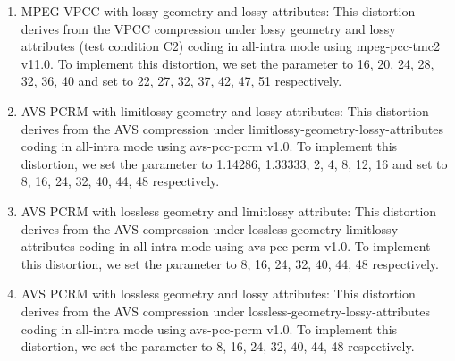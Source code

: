 \documentclass[acmsmall]{acmart}
\begin{document}
\begin{enumerate}
  \item {\sf MPEG VPCC with lossy geometry and lossy attributes}:  This distortion derives from the VPCC compression under lossy geometry and lossy attributes (test condition C2) coding in all-intra mode using mpeg-pcc-tmc2 v11.0. To implement this distortion, we set the parameter  to 16, 20, 24, 28, 32, 36, 40 and set  to 22, 27, 32, 37, 42, 47, 51 respectively.
  \item {\sf AVS PCRM with limitlossy geometry and lossy attributes}: This distortion derives from the AVS compression under limitlossy-geometry-lossy-attributes coding in all-intra mode using avs-pcc-pcrm v1.0. To implement this distortion, we set the parameter  to 1.14286, 1.33333, 2, 4, 8, 12, 16 and set  to 8, 16, 24, 32, 40, 44, 48 respectively.
  \item {\sf AVS PCRM with lossless geometry and limitlossy attribute}: This distortion derives from the AVS compression under lossless-geometry-limitlossy-attributes coding in all-intra mode using avs-pcc-pcrm v1.0. To implement this distortion, we set the parameter  to 8, 16, 24, 32, 40, 44, 48 respectively.
  \item {\sf AVS PCRM with lossless geometry and lossy attributes}: This distortion derives from the AVS compression under lossless-geometry-lossy-attributes coding in all-intra mode using avs-pcc-pcrm v1.0. To implement this distortion, we set the parameter  to 8, 16, 24, 32, 40, 44, 48 respectively.

\end{enumerate}
\end{document}
